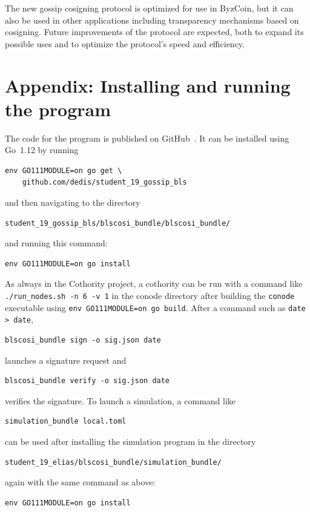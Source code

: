 The new gossip cosigning protocol is optimized for use in ByzCoin, but it can also be used in other applications including transparency mechanisms based on cosigning.
Future improvements of the protocol are expected, both to expand its possible uses and to optimize the protocol's speed and efficiency.


\newpage
\appendix

\section{Appendix: Installing and running the program}

The code for the program is published on GitHub~\cite{SemProj}.
It can be installed using Go~1.12 by running
\begin{verbatim}
env GO111MODULE=on go get \
    github.com/dedis/student_19_gossip_bls
\end{verbatim}
and then navigating to the directory
\begin{verbatim}
student_19_gossip_bls/blscosi_bundle/blscosi_bundle/
\end{verbatim}
and running this command:
\begin{verbatim}
env GO111MODULE=on go install
\end{verbatim}

As always in the Cothority project, a cothority can be run with a command like \texttt{./run\_nodes.sh -n 6 -v 1} in the conode directory after building the \texttt{conode} executable using \texttt{env GO111MODULE=on go build}.
After a command such as \texttt{date > date},
\begin{verbatim}
blscosi_bundle sign -o sig.json date
\end{verbatim}
launches a signature request and
\begin{verbatim}
blscosi_bundle verify -o sig.json date
\end{verbatim}
verifies the signature.
To launch a simulation, a command like
\begin{verbatim}
simulation_bundle local.toml
\end{verbatim}
can be used after installing the simulation program in the directory
\begin{verbatim}
student_19_elias/blscosi_bundle/simulation_bundle/
\end{verbatim}
again with the same command as above:
\begin{verbatim}
env GO111MODULE=on go install
\end{verbatim}


